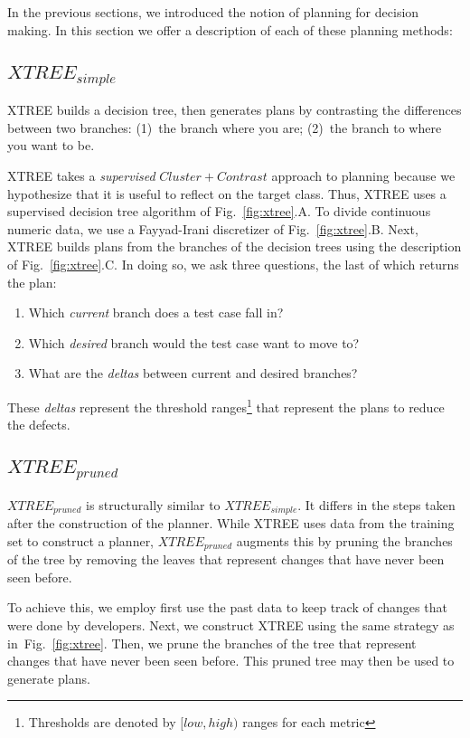 \documentclass[sigconf, proceedings, 9pt]{acmart}
\newcommand{\be}{\begin{enumerate}}
\newcommand{\ee}{\end{enumerate}}
\newcommand{\fig}[1]{Fig.~\ref{fig:#1}}
\begin{document}
In the previous sections, we introduced the notion of planning for decision 
making. In this section we offer a description of each of these planning 
methods:

\subsection{$XTREE_{simple}$}
\label{sect:XTREE}



XTREE builds a decision tree,  then generates
plans by contrasting the differences between two branches:
(1)~the branch where you are; (2)~the branch to where you want to be.

XTREE takes a {\em supervised} $Cluster+Contrast$ approach to planning because 
we hypothesize that it is useful to reflect on the target class. Thus, XTREE 
uses a supervised decision tree algorithm of \fig{xtree}.A. To divide 
continuous numeric data, we use a Fayyad-Irani discretizer of \fig{xtree}.B.
Next, XTREE builds plans from the branches of the decision trees using the 
description of \fig{xtree}.C.
In doing so, we ask three questions, the last of which returns the plan:
\be
\item
Which {\em current} branch does a test case fall in?
\item Which {\em desired} branch would the test case want to move to?
\item What are the {\em deltas} between current and desired branches? 
\ee
These \textit{deltas} represent the threshold ranges\footnote{Thresholds are 
denoted by $[low,high)$ ranges for each metric} that represent the plans to 
reduce the defects. 


\subsection{$XTREE_{pruned}$}
$XTREE_{pruned}$ is structurally similar to $XTREE_{simple}$. It differs in the 
steps taken after the construction of the planner. While XTREE uses data from 
the training set to construct a planner, $XTREE_{pruned}$ augments this by 
pruning the branches of the tree by removing the leaves that represent changes 
that have never been seen before. 

To achieve this, we employ first use the past data to keep track of changes 
that were done by developers. Next, we construct XTREE using the same strategy 
as in~\fig{xtree}.  Then, we prune the branches of the tree that represent 
changes that have never been seen before. This pruned tree may then be used to 
generate plans. 
\end{document}
